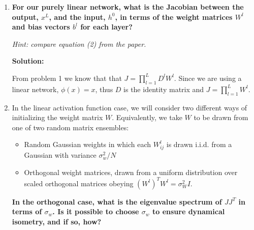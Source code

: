 \documentclass[a4paper]{article}
\begin{document}
\begin{enumerate}[label=(\alph*)]

\item \textbf{For our purely linear network, what is the Jacobian between the output, $x^L$, and the input, $h^0$, in terms of the weight matrices $W^l$ and bias vectors $b^l$ for each layer?}

\textit{Hint: compare equation (2) from the paper.}

\vspace{15mm}

\begin{tcolorbox}
\textbf{Solution:}


From problem 1 we know that that $J = \prod_{l=1}^L D^l W^l$. Since we are using a linear network, $\phi (x) = x$, thus $D$ is the identity matrix and $J = \prod_{l=1}^L W^l$.
\end{tcolorbox}

\item In the linear activation function case, we will consider two different ways of initializing the weight matrix $W$.  Equivalently, we take $W$ to be drawn from one of two random matrix ensembles: 
\begin{itemize}
\item Random Gaussian weights in which each $W_{ij}^l$ is drawn i.i.d. from a Gaussian with variance $\sigma_w^2/N$
\item Orthogonal weight matrices, drawn from a uniform distribution over scaled orthogonal matrices obeying $(W^l)^T W^l = \sigma_W^2 I$.
\end{itemize}

\textbf{In the orthogonal case, what is the eigenvalue spectrum of $JJ^T$ in terms of $\sigma_w$.  Is it possible to choose $\sigma_w$ to ensure dynamical isometry, and if so, how?}

\end{enumerate}
\end{document}
